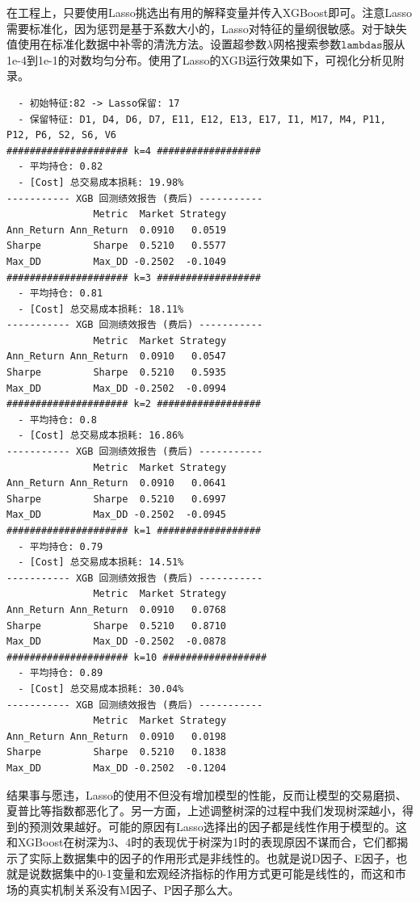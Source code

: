 \documentclass[11pt, a4paper]{article}
\begin{document}
在工程上，只要使用Lasso挑选出有用的解释变量并传入XGBoost即可。注意Lasso需要标准化，因为惩罚是基于系数大小的，Lasso对特征的量纲很敏感。对于缺失值使用在标准化数据中补零的清洗方法。设置超参数$\lambda$网格搜索参数$\texttt{lambdas}$服从1e-4到1e-1的对数均匀分布。使用了Lasso的XGB运行效果如下，可视化分析见附录。
\begin{verbatim}
  - 初始特征:82 -> Lasso保留: 17
  - 保留特征: D1, D4, D6, D7, E11, E12, E13, E17, I1, M17, M4, P11, P12, P6, S2, S6, V6
##################### k=4 ##################
  - 平均持仓: 0.82 
  - [Cost] 总交易成本损耗: 19.98%
----------- XGB 回测绩效报告 (费后) -----------
               Metric  Market Strategy
Ann_Return Ann_Return  0.0910   0.0519
Sharpe         Sharpe  0.5210   0.5577
Max_DD         Max_DD -0.2502  -0.1049
##################### k=3 ##################
  - 平均持仓: 0.81 
  - [Cost] 总交易成本损耗: 18.11%
----------- XGB 回测绩效报告 (费后) -----------
               Metric  Market Strategy
Ann_Return Ann_Return  0.0910   0.0547
Sharpe         Sharpe  0.5210   0.5935
Max_DD         Max_DD -0.2502  -0.0994
##################### k=2 ##################
  - 平均持仓: 0.8 
  - [Cost] 总交易成本损耗: 16.86%
----------- XGB 回测绩效报告 (费后) -----------
               Metric  Market Strategy
Ann_Return Ann_Return  0.0910   0.0641
Sharpe         Sharpe  0.5210   0.6997
Max_DD         Max_DD -0.2502  -0.0945
##################### k=1 ##################
  - 平均持仓: 0.79 
  - [Cost] 总交易成本损耗: 14.51%
----------- XGB 回测绩效报告 (费后) -----------
               Metric  Market Strategy
Ann_Return Ann_Return  0.0910   0.0768
Sharpe         Sharpe  0.5210   0.8710
Max_DD         Max_DD -0.2502  -0.0878
##################### k=10 ##################
  - 平均持仓: 0.89 
  - [Cost] 总交易成本损耗: 30.04%
----------- XGB 回测绩效报告 (费后) -----------
               Metric  Market Strategy
Ann_Return Ann_Return  0.0910   0.0198
Sharpe         Sharpe  0.5210   0.1838
Max_DD         Max_DD -0.2502  -0.1204
\end{verbatim}
结果事与愿违，Lasso的使用不但没有增加模型的性能，反而让模型的交易磨损、夏普比等指数都恶化了。另一方面，上述调整树深的过程中我们发现树深越小，得到的预测效果越好。可能的原因有Lasso选择出的因子都是线性作用于模型的。这和XGBoost在树深为3、4时的表现优于树深为1时的表现原因不谋而合，它们都揭示了实际上数据集中的因子的作用形式是非线性的。也就是说D因子、E因子，也就是说数据集中的0-1变量和宏观经济指标的作用方式更可能是线性的，而这和市场的真实机制关系没有M因子、P因子那么大。
\end{document}
